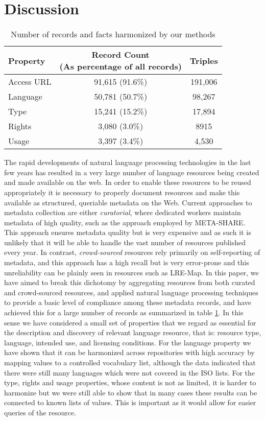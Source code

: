 \documentclass[11pt]{article}
\begin{document}
\section{Discussion}
\label{discussion}

\begin{table}
    \begin{tabular}{l|cc}
        Property   &  \thead{Record Count\\(As percentage of all records)} & Triples \\
        \hline
        Access URL &  91,615 (91.6\%) & 191,006  \\
        Language   &  50,781 (50.7\%) & 98,267   \\
        Type       &  15,241 (15.2\%) & 17,894   \\
        Rights     &   3,080 (3.0\%)  & 8915     \\
        Usage      &   3,397 (3.4\%)  & 4,530    \\ 
    \end{tabular}
    \caption{\label{tab:total}Number of records and facts harmonized by our
    methods}
\end{table}
        



The rapid developments of natural language processing technologies in the last
few years has resulted in a very large number of language resources being
created and made available on the web. In order to enable these resources to be
reused appropriately it is necessary to properly document resources and make
this available as structured, queriable metadata on the Web. Current approaches
to metadata collection are either \emph{curatorial}, where dedicated workers
maintain metadata of high quality, such as the approach employed by META-SHARE.
This approach ensures metadata quality but is very expensive and as such it is
unlikely that it will be able to handle the vast number of resources published
every year. In contrast, \emph{crowd-sourced} resources rely primarily on
self-reporting of metadata, and this approach has a high recall but is very
error-prone and this unreliability can be plainly seen in resources such as
LRE-Map. In this paper, we have aimed to break this dichotomy by aggregating
resources from both curated and crowd-sourced resources, and applied natural language
processing techniques to provide a basic level of compliance among these
metadata records, and have achieved this for a large number of records as
summarized in table \ref{tab:total}. In this sense we have considered a small set of properties that we regard as essential for the description and discovery of relevant language resource, that is: resource type, language, intended use, and licensing conditions.
For the
language property we have shown that it can be harmonized across repositories with high accuracy by mapping values to a 
controlled vocabulary list, although the data indicated that there were still
many languages which were not covered in the ISO lists. For the type, rights and usage
properties, whose content is not as limited, it is harder to harmonize but we
were still able to show that in many cases these results can be connected to
known lists of values. This is important as it would allow for easier queries of
the resource. 
\end{document}
